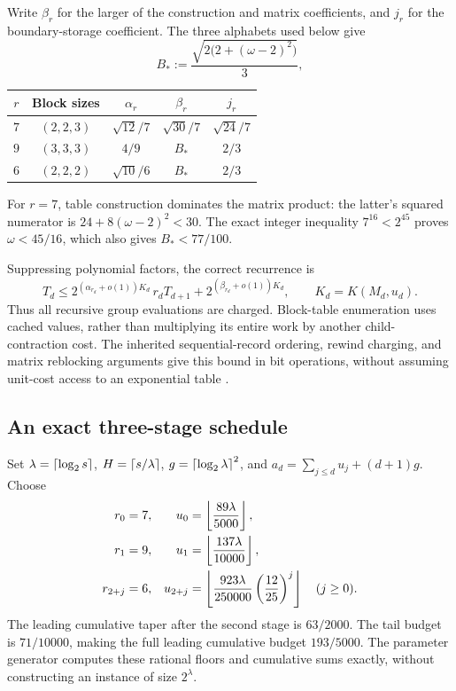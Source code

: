 Write $\beta_r$ for the larger of the construction and matrix coefficients,
and $j_r$ for the boundary-storage coefficient. The three alphabets used
below give
\[
 B_*:=\frac{\sqrt{2\bigl(2+(\omega-2)^2\bigr)}}3,
\]
\begin{center}
\begin{tabular}{@{}ccccc@{}}
\toprule
$r$ & Block sizes & $\alpha_r$ & $\beta_r$ & $j_r$\\
\midrule
$7$ & $(2,2,3)$ & $\sqrt{12}/7$ & $\sqrt{30}/7$ & $\sqrt{24}/7$\\
$9$ & $(3,3,3)$ & $4/9$ & $B_*$ & $2/3$\\
$6$ & $(2,2,2)$ & $\sqrt{10}/6$ & $B_*$ & $2/3$\\
\bottomrule
\end{tabular}
\end{center}
For $r=7$, table construction dominates the matrix product: the latter's
squared numerator is $24+8(\omega-2)^2<30$. The exact integer inequality
$7^{16}<2^{45}$ proves $\omega<45/16$, which also gives $B_*<77/100$.

Suppressing polynomial factors, the correct recurrence is
\begin{equation}\label{eq:cached-recurrence}
 T_d\le 2^{(\alpha_{r_d}+o(1))K_d}\,r_dT_{d+1}
       +2^{(\beta_{r_d}+o(1))K_d},
 \qquad K_d=K(M_d,u_d).
\end{equation}
Thus all recursive group evaluations are charged. Block-table enumeration
uses cached values, rather than multiplying its entire work by another
child-contraction cost. The inherited sequential-record ordering, rewind
charging, and matrix reblocking arguments give this bound in bit operations,
without assuming unit-cost access to an exponential table \cite{joint}.

\subsection{An exact three-stage schedule}

Set $\lambda=\left\lceil\log_2s\right\rceil$, $H=\left\lceil s/\lambda\right\rceil$,
$g=\left\lceil\log_2\lambda\right\rceil^{2}$, and
$a_d=\sum_{j\le d}u_j+(d+1)g$. Choose
\begin{align}
 r_0&=7,&u_0&=\left\lfloor\frac{89\lambda}{5000}\right\rfloor,\notag\\
 r_1&=9,&u_1&=\left\lfloor\frac{137\lambda}{10000}\right\rfloor,\label{eq:cached-schedule}\\
 r_{2+j}&=6,&u_{2+j}&=
 \left\lfloor\frac{923\lambda}{250000}\left(\frac{12}{25}\right)^j\right\rfloor
 \quad(j\ge0).\notag
\end{align}
The leading cumulative taper after the second stage is $63/2000$.
The tail budget is $71/10000$, making the full leading cumulative budget
$193/5000$. The parameter generator computes these rational floors and
cumulative sums exactly, without constructing an instance of size $2^\lambda$.

